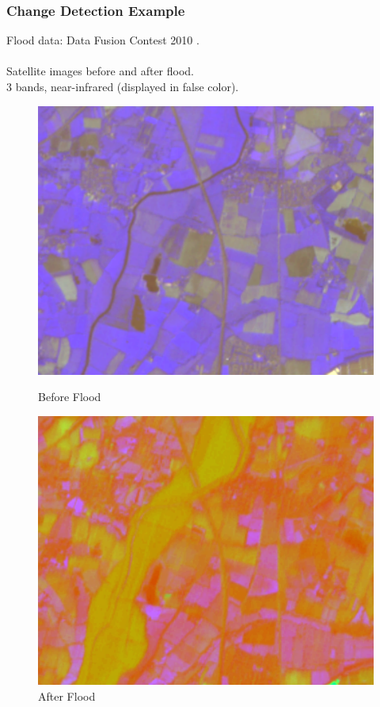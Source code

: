 \documentclass{beamer}
\begin{document}
\begin{frame}
  \frametitle{Change Detection Example}
  Flood data: Data Fusion Contest 2010 \cite{Longbotham2012}.\\~\\
  Satellite images before and after flood.\\
  3 bands, near-infrared (displayed in false color).
  \begin{figure}[ht]
    \centering
    \hfill
    \begin{minipage}[b]{0.40\linewidth}
      \centering
      \includegraphics[width=\textwidth]{./Images/ChangeDetect/Flood/pictureX.png}
      \caption{Before Flood}
    \end{minipage}
    \hfill
    \begin{minipage}[b]{0.40\linewidth}
      \centering
      \includegraphics[width=\textwidth]{./Images/ChangeDetect/Flood/pictureY.png}
      \caption{After Flood}
    \end{minipage}
    \hfill
  \end{figure}
\end{frame}
\end{document}
